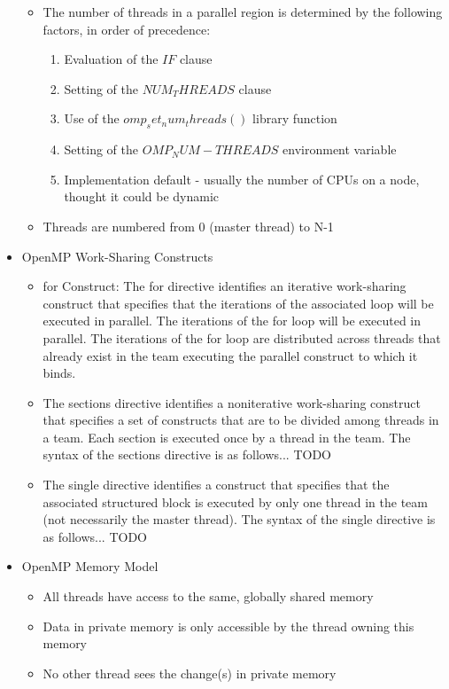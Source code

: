 \documentclass[paper=a4, fontsize=11pt]{scrartcl} %
\numberwithin{equation}{section} %
\numberwithin{figure}{section} %
\numberwithin{table}{section} %
\begin{document}
\begin{itemize}
  \begin{itemize}
    \item The number of threads in a parallel region is determined by the following factors, in order of precedence:
    \begin{enumerate}
      \item Evaluation of the $IF$ clause
      \item Setting of the $NUM_THREADS$ clause
      \item Use of the $omp_set_num_threads()$ library function
      \item Setting of the $OMP_NUM-THREADS$ environment variable
      \item Implementation default - usually the number of CPUs on a node, thought it could be dynamic
    \end{enumerate}
    \item Threads are numbered from 0 (master thread) to N-1
  \end{itemize}
  \item OpenMP Work-Sharing Constructs
  \begin{itemize}
    \item for Construct: The for directive identifies an iterative work-sharing construct that specifies that the iterations of the associated loop will be executed in parallel. The iterations of the for loop will be executed in parallel. The iterations of the for loop are distributed across threads that already exist in the team executing the parallel construct to which it binds.
    \item The sections directive identifies a noniterative work-sharing construct that specifies a set of constructs that are to be divided among threads in a team. Each section is executed once by a thread in the team. The syntax of the sections directive is as follows... TODO
    \item The single directive identifies a construct that specifies that the associated structured block is executed by only one thread in the team (not necessarily the master thread). The syntax of the single directive is as follows... TODO
  \end{itemize}
  \item OpenMP Memory Model
  \begin{itemize}
    \item All threads have access to the same, globally shared memory
    \item Data in private memory is only accessible by the thread owning this memory
    \item No other thread sees the change(s) in private memory

\end{itemize}
\end{itemize}
\end{document}
